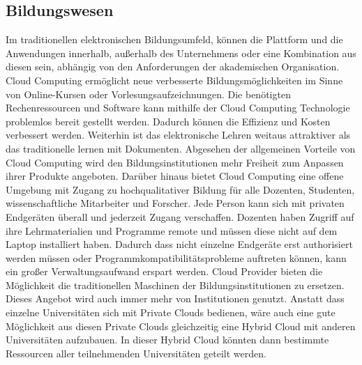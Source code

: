 \subsection{Bildungswesen}
Im traditionellen elektronischen Bildungsumfeld, können die Plattform und die Anwendungen innerhalb, außerhalb des Unternehmens oder eine Kombination aus diesen sein, abhängig von den Anforderungen der akademischen Organisation\cite{teaching}. Cloud Computing ermöglicht neue verbesserte Bildungsmöglichkeiten im Sinne von Online-Kursen oder Vorlesungsaufzeichnungen. Die benötigten Rechenressourcen und Software kann mithilfe der Cloud Computing Technologie problemlos bereit gestellt werden. Dadurch können die Effizienz und Kosten verbessert werden. Weiterhin ist das elektronische Lehren weitaus attraktiver als das traditionelle lernen mit Dokumenten\cite{teaching}.
Abgesehen der allgemeinen Vorteile von Cloud Computing wird den Bildungsinstitutionen mehr Freiheit zum Anpassen ihrer Produkte angeboten. Darüber hinaus bietet Cloud Computing eine offene Umgebung mit Zugang zu hochqualitativer Bildung für alle Dozenten, Studenten, wissenschaftliche Mitarbeiter und Forscher. Jede Person kann sich mit privaten Endgeräten überall und jederzeit Zugang verschaffen. Dozenten haben Zugriff auf ihre Lehrmaterialien und Programme remote und müssen diese nicht auf dem Laptop installiert haben. Dadurch dass nicht einzelne Endgeräte erst authorisiert werden müssen oder Programmkompatibilitätsprobleme auftreten können, kann ein großer Verwaltungsaufwand erspart werden. Cloud Provider bieten die Möglichkeit die traditionellen Maschinen der Bildungsinstitutionen zu ersetzen. Dieses Angebot wird auch immer mehr von Institutionen genutzt. Anstatt dass einzelne Universitäten sich mit Private Clouds bedienen, wäre auch eine gute Möglichkeit aus diesen Private Clouds gleichzeitig eine Hybrid Cloud mit anderen Universitäten aufzubauen. In dieser Hybrid Cloud könnten dann bestimmte Ressourcen aller teilnehmenden Universitäten geteilt werden\cite{recenttrends}.